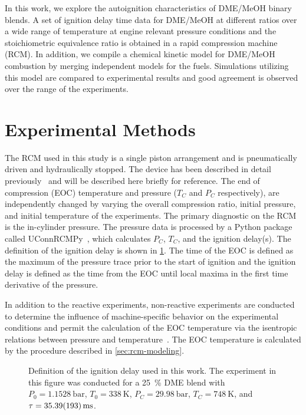 \documentclass[12pt]{../ussci}
\begin{document}
In this work, we explore the autoignition characteristics of DME/MeOH binary
blends. A set of ignition delay time data for DME/MeOH at different ratios over
a wide range of temperature at engine relevant pressure conditions and the
stoichiometric equivalence ratio is obtained in a rapid compression machine
(RCM). In addition, we compile a chemical kinetic model for DME/MeOH combustion
by merging independent models for the fuels. Simulations utilizing this model
are compared to experimental results and good agreement is observed over the
range of the experiments.

\section{Experimental Methods}\label{sec:experimental-methods}

The RCM used in this study is a single piston arrangement and is pneumatically
driven and hydraulically stopped. The device has been described in detail
previously~\autocite{Mittal2007a} and will be described here briefly for
reference. The end of compression (EOC) temperature and pressure (\(T_C\) and
\(P_C\) respectively), are independently changed by varying the overall
compression ratio, initial pressure, and initial temperature of the experiments.
The primary diagnostic on the RCM is the in-cylinder pressure. The pressure data
is processed by a Python package called UConnRCMPy~\autocite{uconnrcmpy}, which
calculates \(P_C\), \(T_C\), and the ignition delay(s). The definition of the
ignition delay is shown in \cref{fig:ign-delay-def}. The time of the EOC is
defined as the maximum of the pressure trace prior to the start of ignition and
the ignition delay is defined as the time from the EOC until local maxima in
the first time derivative of the pressure.

In addition to the reactive experiments, non-reactive experiments are conducted
to determine the influence of machine-specific behavior on the experimental
conditions and permit the calculation of the EOC temperature via the isentropic
relations between pressure and temperature~\autocite{Lee1998}. The EOC
temperature is calculated by the procedure described in
\cref{sec:rcm-modeling}.

\begin{figure}[htb]
    \centering
    \resizebox{0.6\textwidth}{!}{}
    \caption{Definition of the ignition delay used in this work. The
    experiment in this figure was conducted for a \SI{25}{\percent} DME blend
    with \(P_0=\SI{1.1528}{\bar}\), \(T_0=\SI{338}{\K}\),
    \(P_C=\SI{29.98}{\bar}\), \(T_C=\SI{748}{\K}\), and
    \(\tau=\SI{35.39\pm1.93}{\ms}\).}
    \label{fig:ign-delay-def}
\end{figure}
\end{document}
